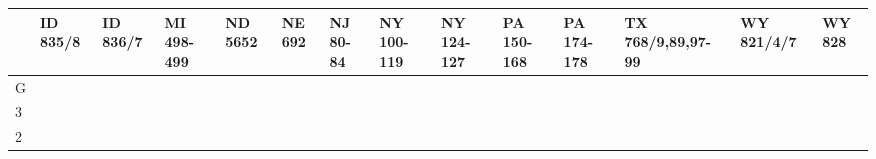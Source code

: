 \documentclass{article}
\begin{document}
\begin{table}
\normalsize{}
\begin{tabular}{@{}llllllllllllll@{}}
\toprule
 & ID 835/8           & ID 836/7           & MI 498-499         & ND 5652           & NE 692             & NJ 80-84           & NY 100-119       & NY 124-127       & PA 150-168         & PA 174-178         & TX 768/9,89,97-99  & WY 821/4/7       & WY 828           \\ \midrule
G & \cellcolor{yellow} & \cellcolor{orange} & \cellcolor{orange} & \cellcolor{green} & \cellcolor{purple} & \cellcolor{yellow} & \cellcolor{red}  & \cellcolor{red}  & \cellcolor{yellow} & \cellcolor{orange} & \cellcolor{purple} & \cellcolor{grey} & \cellcolor{grey} \\ \hline
3 & \cellcolor{blue}   & \cellcolor{blue}   & \cellcolor{orange} & \cellcolor{green} & \cellcolor{purple} & \cellcolor{yellow} & \cellcolor{blue} & \cellcolor{blue} & \cellcolor{yellow} & \cellcolor{orange} & \cellcolor{blue}   & \cellcolor{grey} & \cellcolor{blue} \\ \hline
2 & \cellcolor{blue}   & \cellcolor{blue}   & \cellcolor{orange} & \cellcolor{green} & \cellcolor{purple} & \cellcolor{blue}   & \cellcolor{blue} & \cellcolor{blue} & \cellcolor{yellow} & \cellcolor{blue}   & \cellcolor{blue}   & \cellcolor{blue} & \cellcolor{blue} \\ \bottomrule
\end{tabular}
\vspace{1ex}

\end{table}
\vspace{10ex}
\end{document}
